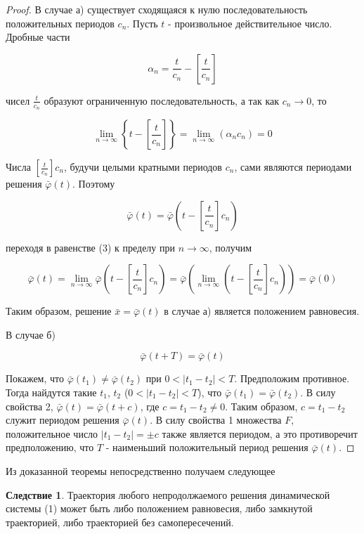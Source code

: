 \documentclass{article}
\theoremstyle{definition} \newtheorem*{theorem*}{Теорема}
\theoremstyle{plain} \newtheorem{theorem}{Теорема}[section]
\theoremstyle{definition} \newtheorem*{corollary*}{Следствие}
\theoremstyle{definition} \newtheorem{corollary}{Следствие}[section]
\begin{document}
\begin{proof}
    В случае а) существует сходящаяся к нулю
    последовательность положительных периодов $c_n$.
    Пусть $t$ - произвольное действительное число.
    Дробные части

    \begin{equation*}
        \alpha_n = \frac{t}{c_n} - \left[ \frac{t}{c_n} \right]
    \end{equation*}

    чисел $\frac{t}{c_n}$ образуют ограниченную
    последовательность, а так как $c_n \rightarrow 0$, то

    \begin{equation*}
        \lim_{n \rightarrow \infty}
        \left\{ t - \left[ \frac{t}{c_n}\right]\right\}
        = \lim_{n \rightarrow \infty} (\alpha_n c_n) = 0
    \end{equation*}

    Числа $\left[ \frac{t}{c_n} \right] c_n$,
    будучи целыми кратными периодов $c_n$,
    сами являются периодами решения $\bar{\varphi}(t)$.
    Поэтому

    \begin{equation*}
        \bar{\varphi}(t)
        = \bar{\varphi}
        \left( t - \left[\frac{t}{c_n} \right] c_n \right)
    \end{equation*}

    переходя в равенстве (3) к пределу при
    $n \rightarrow \infty$, получим

    \begin{equation*}
        \bar{\varphi}(t)
        = \lim_{n \rightarrow \infty} \bar{\varphi}
        \left( t - \left[\frac{t}{c_n}\right] c_n \right)
        = \bar{\varphi} \left( \lim_{n \rightarrow \infty}
        \left( t - \left[ \frac{t}{c_n} \right] c_n
        \right)\right)
        = \bar{\varphi}(0)
    \end{equation*}

    Таким образом, решение $\bar{x} = \bar{\varphi}(t)$
    в случае а) является положением равновесия.

    В случае б)

    \begin{equation*}
        \bar{\varphi}(t + T) = \bar{\varphi}(t)
    \end{equation*}

    Покажем, что $\bar{\varphi}(t_1) \ne \bar{\varphi}(t_2)$
    при $0 < \vert t_1 - t_2 \vert < T$.
    Предположим противное. Тогда найдутся
    такие $t_1$, $t_2$ ($0 < \vert t_1 - t_2 \vert < T$),
    что $\bar{\varphi}(t_1) = \bar{\varphi}(t_2)$. В силу свойства 2,
    $ \bar{\varphi}(t) = \bar{\varphi}(t + c)$,
    где $c = t_1 - t_2 \ne 0$.
    Таким образом, $c = t_1 - t_2$ служит периодом
    решения $\bar{\varphi}(t)$. В силу свойства 1
    множества $F$, положительное число
    $\vert t_1 - t_2 \vert = \pm c$ также является
    периодом, а это противоречит
    предположению, что $T$ - наименьший положительный
    период решения $\bar{\varphi}(t)$.
\end{proof}

    Из доказанной теоремы непосредственно получаем следующее

    \begin{corollary*}
    Траектория любого непродолжаемого
    решения динамической системы (1) может быть либо
    положением равновесия, либо замкнутой
    траекторией, либо траекторией без самопересечений.
    \end{corollary*}
\end{document}
